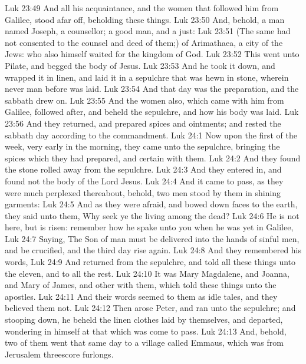 \vs Luk 23:49 And all his acquaintance, and the women that followed him from Galilee, stood afar off, beholding these things.
\vs Luk 23:50 And, behold,  a man named Joseph, a counsellor;  a good man, and a just:
\vs Luk 23:51 (The same had not consented to the counsel and deed of them;)  of Arimathaea, a city of the Jews: who also himself waited for the kingdom of God.
\vs Luk 23:52 This  went unto Pilate, and begged the body of Jesus.
\vs Luk 23:53 And he took it down, and wrapped it in linen, and laid it in a sepulchre that was hewn in stone, wherein never man before was laid.
\vs Luk 23:54 And that day was the preparation, and the sabbath drew on.
\vs Luk 23:55 And the women also, which came with him from Galilee, followed after, and beheld the sepulchre, and how his body was laid.
\vs Luk 23:56 And they returned, and prepared spices and ointments; and rested the sabbath day according to the commandment.
\vs Luk 24:1 Now upon the first  of the week, very early in the morning, they came unto the sepulchre, bringing the spices which they had prepared, and certain  with them.
\vs Luk 24:2 And they found the stone rolled away from the sepulchre.
\vs Luk 24:3 And they entered in, and found not the body of the Lord Jesus.
\vs Luk 24:4 And it came to pass, as they were much perplexed thereabout, behold, two men stood by them in shining garments:
\vs Luk 24:5 And as they were afraid, and bowed down  faces to the earth, they said unto them, Why seek ye the living among the dead?
\vs Luk 24:6 He is not here, but is risen: remember how he spake unto you when he was yet in Galilee,
\vs Luk 24:7 Saying, The Son of man must be delivered into the hands of sinful men, and be crucified, and the third day rise again.
\vs Luk 24:8 And they remembered his words,
\vs Luk 24:9 And returned from the sepulchre, and told all these things unto the eleven, and to all the rest.
\vs Luk 24:10 It was Mary Magdalene, and Joanna, and Mary  of James, and other  with them, which told these things unto the apostles.
\vs Luk 24:11 And their words seemed to them as idle tales, and they believed them not.
\vs Luk 24:12 Then arose Peter, and ran unto the sepulchre; and stooping down, he beheld the linen clothes laid by themselves, and departed, wondering in himself at that which was come to pass.
\vs Luk 24:13 And, behold, two of them went that same day to a village called Emmaus, which was from Jerusalem  threescore furlongs.
